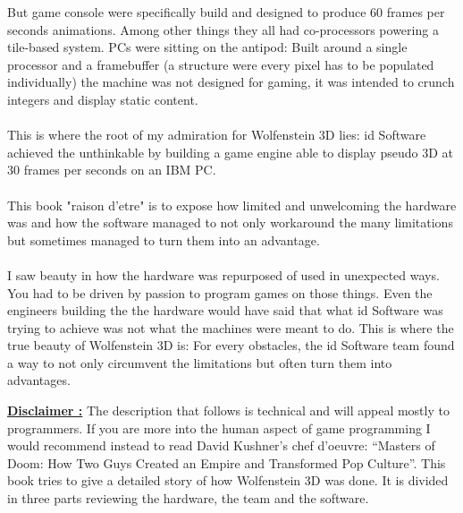 But game console were specifically build and designed to produce 60 frames per seconds animations. Among other things they all had co-processors powering a tile-based system. PCs were sitting on the antipod: Built around a single processor and a framebuffer (a structure were every pixel has to be populated individually) the machine was not designed for gaming, it was intended to crunch integers and display static content.\\
\\
This is where the root of my admiration for Wolfenstein 3D lies: id Software achieved the unthinkable by building a game engine able to display pseudo 3D at 30 frames per seconds on an IBM PC.\\
\\
This book "raison d'etre" is to expose how limited and unwelcoming the hardware was and how the software managed to not only workaround the many limitations but sometimes managed to turn them into an advantage.\\
\\
I saw beauty in how the hardware was repurposed of used in unexpected ways. You had to be driven by passion to program games on those things. Even the engineers building the the hardware would have said that what id Software was trying to achieve was not what the machines were meant to do. This is where the true beauty of Wolfenstein 3D is: For every obstacles, the id Software team found a way to not only circumvent the limitations but often turn them into advantages.

\bigskip

 \textbf{\underline{Disclaimer :}} The description that follows is technical and will appeal mostly to programmers. If you are more into the human aspect of game programming I would recommend instead to read David Kushner’s chef d’oeuvre: “Masters of Doom: How Two Guys Created an Empire and Transformed Pop Culture”.
This book tries to give a detailed story of how Wolfenstein 3D was done. It is divided in three parts reviewing the hardware, the team and the software.